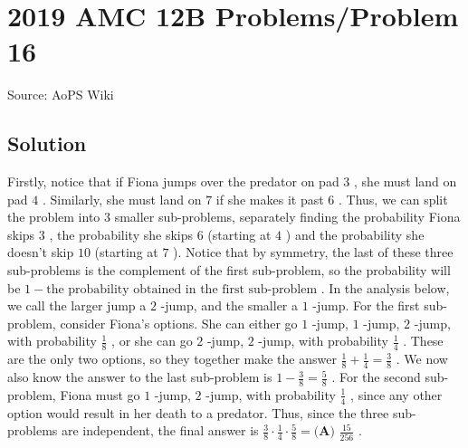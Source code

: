 \documentclass[12pt]{article}
\begin{document}
\section*{{2019 AMC 12B Problems/Problem 16}}
Source: AoPS Wiki

\subsection*{Solution}
Firstly, notice that if Fiona jumps over the predator on pad $3$ , she must land on pad $4$ . Similarly, she must land on $7$ if she makes it past $6$ . Thus, we can split the problem into $3$ smaller sub-problems, separately finding the probability Fiona skips $3$ , the probability she skips $6$ (starting at $4$ ) and the probability she doesn't skip $10$ (starting at $7$ ). Notice that by symmetry, the last of these three sub-problems is the complement of the first sub-problem, so the probability will be $1 - \text{the probability obtained in the first sub-problem}$ . In the analysis below, we call the larger jump a $2$ -jump, and the smaller a $1$ -jump. For the first sub-problem, consider Fiona's options. She can either go $1$ -jump, $1$ -jump, $2$ -jump, with probability $\frac{1}{8}$ , or she can go $2$ -jump, $2$ -jump, with probability $\frac{1}{4}$ . These are the only two options, so they together make the answer $\frac{1}{8}+\frac{1}{4}=\frac{3}{8}$ . We now also know the answer to the last sub-problem is $1-\frac{3}{8}=\frac{5}{8}$ . For the second sub-problem, Fiona must go $1$ -jump, $2$ -jump, with probability $\frac{1}{4}$ , since any other option would result in her death to a predator. Thus, since the three sub-problems are independent, the final answer is $\frac{3}{8} \cdot \frac{1}{4} \cdot \frac{5}{8} = \boxed{\textbf{(A) }\frac{15}{256}}$ .
\end{document}

